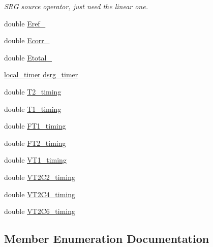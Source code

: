 \begin{DoxyCompactItemize}
\begin{DoxyCompactList}\small\item\em S\+RG source operator, just need the linear one. \end{DoxyCompactList}\item 
double \mbox{\hyperlink{classforte_1_1_m_c_s_r_g_p_t2___m_o_a5cb2d5353e670f44e90e7177c9956df3}{Eref\+\_\+}}
\item 
double \mbox{\hyperlink{classforte_1_1_m_c_s_r_g_p_t2___m_o_a1ef3601cacf556b50508c83f4e5893b8}{Ecorr\+\_\+}}
\item 
double \mbox{\hyperlink{classforte_1_1_m_c_s_r_g_p_t2___m_o_a7b97f08442d4e5610c3a7f371827394b}{Etotal\+\_\+}}
\item 
\mbox{\hyperlink{classforte_1_1local__timer}{local\+\_\+timer}} \mbox{\hyperlink{classforte_1_1_m_c_s_r_g_p_t2___m_o_a9b508ab2b3ca78e69ab0df182eafd929}{dsrg\+\_\+timer}}
\item 
double \mbox{\hyperlink{classforte_1_1_m_c_s_r_g_p_t2___m_o_a8e0c4de4b2aca628b9ef53e117e48456}{T2\+\_\+timing}}
\item 
double \mbox{\hyperlink{classforte_1_1_m_c_s_r_g_p_t2___m_o_a12cb08f4ef192953a23441557b36f817}{T1\+\_\+timing}}
\item 
double \mbox{\hyperlink{classforte_1_1_m_c_s_r_g_p_t2___m_o_ae8885ec30ce6680d8c410f738d715a5a}{F\+T1\+\_\+timing}}
\item 
double \mbox{\hyperlink{classforte_1_1_m_c_s_r_g_p_t2___m_o_ae954ecab960ddb36bc419e9b7029ba20}{F\+T2\+\_\+timing}}
\item 
double \mbox{\hyperlink{classforte_1_1_m_c_s_r_g_p_t2___m_o_a7bad86251186ef082e22bc5ace0d0de2}{V\+T1\+\_\+timing}}
\item 
double \mbox{\hyperlink{classforte_1_1_m_c_s_r_g_p_t2___m_o_a8fadc50a8e07348398cfa7e6c4323ff5}{V\+T2\+C2\+\_\+timing}}
\item 
double \mbox{\hyperlink{classforte_1_1_m_c_s_r_g_p_t2___m_o_a760d7803c6cdfeec10e8a745eea0d376}{V\+T2\+C4\+\_\+timing}}
\item 
double \mbox{\hyperlink{classforte_1_1_m_c_s_r_g_p_t2___m_o_a1993b3dec813f7f3a24134f17393db84}{V\+T2\+C6\+\_\+timing}}
\end{DoxyCompactItemize}


\subsection{Member Enumeration Documentation}
\mbox{\label{classforte_1_1_m_c_s_r_g_p_t2___m_o_a541d16aa14bd6d3e685b6bda0b8602f1}} 
